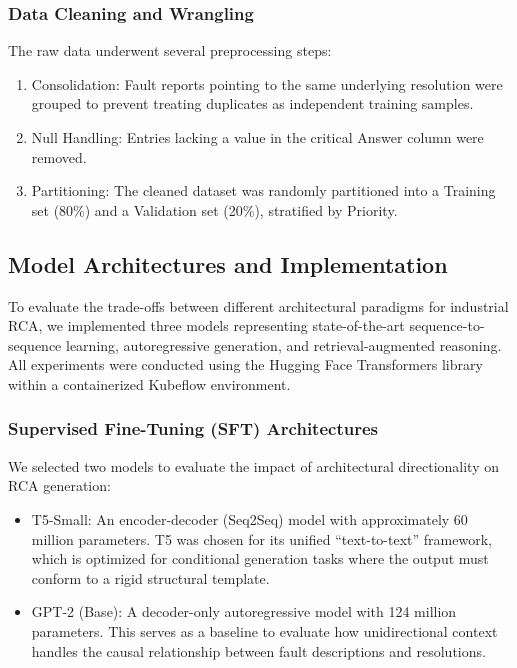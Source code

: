 \documentclass[10pt,twocolumn,journal]{IEEEtran}
\begin{document}
\subsubsection{Data Cleaning and Wrangling}
The raw data underwent several preprocessing steps:
\begin{enumerate}
    \item Consolidation: Fault reports pointing to the same underlying resolution were grouped to prevent treating duplicates as independent training samples.
    \item Null Handling: Entries lacking a value in the critical Answer column were removed.
    \item Partitioning: The cleaned dataset was randomly partitioned into a Training set (80\%) and a Validation set (20\%), stratified by Priority.
\end{enumerate}

\subsection{Model Architectures and Implementation}
\label{subsec:model_architectures}

To evaluate the trade-offs between different architectural paradigms for industrial RCA, we implemented three models representing state-of-the-art sequence-to-sequence learning, autoregressive generation, and retrieval-augmented reasoning. All experiments were conducted using the Hugging Face Transformers library within a containerized Kubeflow environment.

\subsubsection{Supervised Fine-Tuning (SFT) Architectures}
We selected two models to evaluate the impact of architectural directionality on RCA generation:
\begin{itemize}
    \item T5-Small: An encoder-decoder (Seq2Seq) model with approximately 60 million parameters. T5 was chosen for its unified ``text-to-text'' framework, which is optimized for conditional generation tasks where the output must conform to a rigid structural template.
    \item GPT-2 (Base): A decoder-only autoregressive model with 124 million parameters. This serves as a baseline to evaluate how unidirectional context handles the causal relationship between fault descriptions and resolutions.
\end{itemize}
\end{document}
